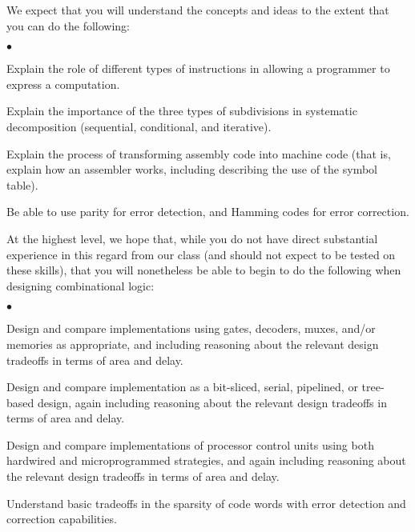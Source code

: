 We expect that you will understand the concepts and ideas to the extent
that you can do the following:

\begin{list}{$\bullet$}{\setlength{\itemsep}{0pt}\setlength{\parskip}{0pt}%
\setlength{\topsep}{0pt}\setlength{\partopsep}{0pt}\setlength{\parsep}{0pt}}

\item{Explain the role of different types of instructions in allowing
a programmer to express a computation.}

%

\item{Explain the importance of the three types of subdivisions in systematic
decomposition (sequential, conditional, and iterative).}

\item{Explain the process of transforming assembly code into machine code
(that is, explain how an assembler works, including describing the use of
the symbol table).}

\item{Be able to use parity for error detection, and Hamming codes for
error correction.}

\end{list}

At the highest level, 
we hope that, while you do not have direct substantial experience in 
this regard from our class (and should not expect to be tested on these
skills), that you will nonetheless be able to begin
to do the following when designing combinational logic:

\begin{list}{$\bullet$}{\setlength{\itemsep}{0pt}\setlength{\parskip}{0pt}%
\setlength{\topsep}{0pt}\setlength{\partopsep}{0pt}\setlength{\parsep}{0pt}}

\item{Design and compare implementations using gates, decoders, muxes, and/or memories 
as appropriate, and including reasoning about the relevant design tradeoffs 
in terms of area and delay.}

\item{Design and compare implementation as a bit-sliced, serial, pipelined, or tree-based 
design, again including reasoning about the relevant design tradeoffs in
terms of area and delay.}

\item{Design and compare implementations of processor control units
using both hardwired and microprogrammed strategies,
and again including reasoning about the relevant design tradeoffs in
terms of area and delay.}

\item{Understand basic tradeoffs in the sparsity of code words with error 
detection and correction capabilities.}

\end{list}

\pagebreak

%
%
